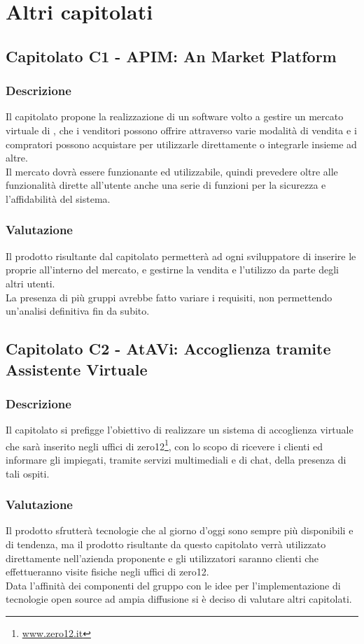 \section{Altri capitolati}

\subsection{Capitolato C1 - APIM: An  Market Platform}
\subsubsection{Descrizione}
Il capitolato propone la realizzazione di un software volto a gestire un mercato virtuale di , che i venditori possono offrire attraverso varie modalità di vendita e i compratori possono acquistare per utilizzarle direttamente o integrarle insieme ad altre.\\
Il mercato dovrà essere funzionante ed utilizzabile, quindi prevedere oltre alle funzionalità dirette all'utente anche una serie di funzioni per la sicurezza e l'affidabilità del sistema.

\subsubsection{Valutazione}
Il prodotto risultante dal capitolato permetterà ad ogni sviluppatore di inserire le proprie  all'interno del mercato, e gestirne la vendita e l'utilizzo da parte degli altri utenti.\\
La presenza di più gruppi avrebbe fatto variare i requisiti, non permettendo un'analisi definitiva fin da subito.

\subsection{Capitolato C2 - AtAVi: Accoglienza tramite Assistente Virtuale}
\subsubsection{Descrizione}
Il capitolato si prefigge l'obiettivo di realizzare un sistema di accoglienza virtuale che sarà inserito negli uffici di zero12\footnote{\url{www.zero12.it}}, con lo scopo di ricevere i clienti ed informare gli impiegati, tramite servizi multimediali e di chat, della presenza di tali ospiti.

\subsubsection{Valutazione}
Il prodotto sfrutterà tecnologie che al giorno d'oggi sono sempre più disponibili e di tendenza, ma il prodotto risultante da questo capitolato verrà utilizzato direttamente nell'azienda proponente e gli utilizzatori saranno clienti che effettueranno visite fisiche negli uffici di zero12.\\
Data l'affinità dei componenti del gruppo con le idee per l'implementazione di tecnologie open source ad ampia diffusione si è deciso di valutare altri capitolati.

